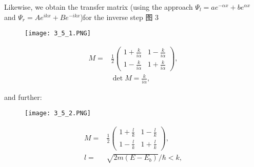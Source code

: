 Likewise, we obtain the transfer matrix (using the approach $Ψ_l = ae^{-αx} + be^{αx}$ and $Ψ_r = Ae^{ikx} + Be^{-ikx}$)for the inverse step
图 3
\begin{figure}[ht]
    \begin{minipage}{0.5\textwidth}
        \centering
        \texttt{[image: 3\_5\_1.PNG]}
    \end{minipage}
    \begin{minipage}{0.5\textwidth}
        \begin{equation}
            \begin{aligned}
                M = &\frac{1}{2}\left(\begin{array}{cc}{1+\frac{k}{i \alpha}} & {1-\frac{k}{i\alpha}}\\{1-\frac{k}{i\alpha}}&{1+\frac{k}{i\alpha}}
                \end{array}\right),
                \\& \operatorname{det}M=\frac{k}{i\alpha},
            \end{aligned}
        \end{equation}
    \end{minipage}
\end{figure}
and further:\\
\begin{figure}[ht]
    \begin{minipage}{0.5\textwidth}
        \centering
        \texttt{[image: 3\_5\_2.PNG]}
    \end{minipage}
    \begin{minipage}{0.5\textwidth}
        \begin{equation}
            \begin{aligned}
                M = &\frac{1}{2}\left(\begin{array}{cc}{1+\frac{l}{k}} & {1-\frac{l}{k}}\\{1-\frac{l}{k}}&{1+\frac{l}{k}}
                \end{array}\right),
                \\l =& \sqrt{2m(E-E_b)}/\hbar<k,
            \end{aligned}
        \end{equation}
    \end{minipage}
\end{figure}

